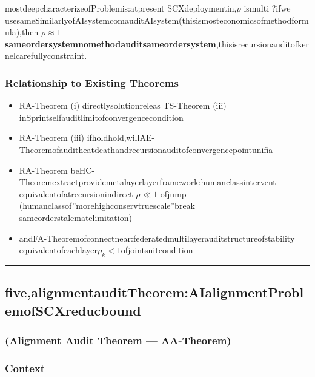 \documentclass[
  12pt,
]{article}
\providecommand{\tightlist}{%
  \setlength{\itemsep}{0pt}\setlength{\parskip}{0pt}}
\begin{document}
mostdeepcharacterizeofProblemis:atpresent SCXdeploymentin,\(\rho\)
ismulti ?ifwe usesameSimilarlyofAIsystemcomauditAIsystem(thisismosteconomicsofmethodformula),then 
\(\rho \approx 1\)------\textbf{sameordersystemnomethodauditsameordersystem},thisisrecursionauditofkernelcarefullyconstraint.

\subsubsection{Relationship to Existing Theorems}\label{ux4e0eux5df2ux6709ux5b9aux7406ux7684ux5173ux7cfb-3}

\begin{itemize}
\tightlist
\item
  RA-Theorem (i) directlysolutionreleas TS-Theorem (iii) inSprintselfauditlimitofconvergencecondition
\item
  RA-Theorem (iii) ifholdhold,willAE-Theoremofauditheatdeathandrecursionauditofconvergencepointunifia 
\item
  RA-Theorem beHC-Theoremextractprovidemetalayerlayerframework:humanclassintervent equivalentofatrecursionindirect 
  \(\rho \ll 1\) ofjump (humanclassof''morehighconservtruescale''break sameorderstalematelimitation)
\item
  andFA-Theoremofconnectnear:federatedmultilayerauditstructureofstability equivalentofeachlayer\(\rho_k < 1\)ofjointsuitcondition
\end{itemize}

\begin{center}\rule{0.5\linewidth}{0.5pt}\end{center}

\subsection{five,alignmentauditTheorem:AIalignmentProblemofSCXreducbound}\label{ux4e94ux5bf9ux9f50ux5ba1ux8ba1ux5b9aux7406aiux5bf9ux9f50ux95eeux9898ux7684scxux5f52ux7ea6}

\subsubsection{(Alignment Audit Theorem ---
AA-Theorem)}\label{alignment-audit-theorem-aa-theorem}

\subsubsection{Context}\label{ux8bedux5883-4}
\end{document}
